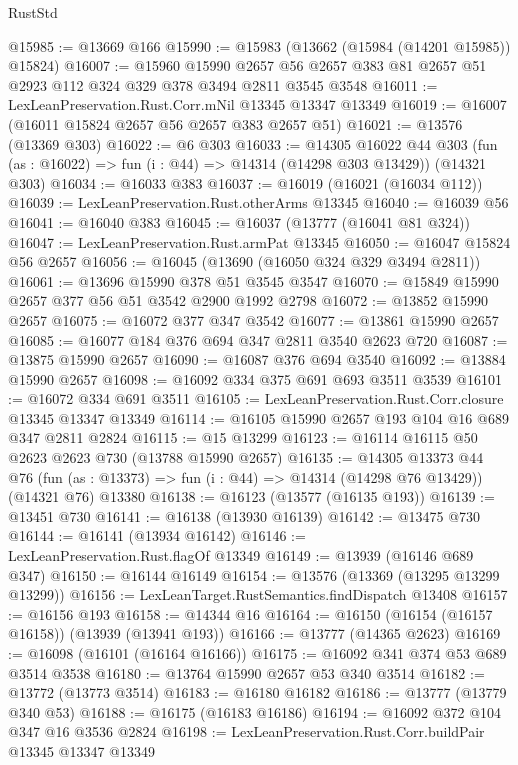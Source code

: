 \begin{lexlean}{RustStd}
\begin{coremodule}
@15985 := @13669 @166
@15990 := @15983 (@13662 (@15984 (@14201 @15985)) @15824)
@16007 := @15960
    @15990
    @2657
    @56
    @2657
    @383
    @81
    @2657
    @51
    @2923
    @112
    @324
    @329
    @378
    @3494
    @2811
    @3545
    @3548
@16011 := LexLeanPreservation.Rust.Corr.mNil @13345 @13347 @13349
@16019 := @16007 (@16011 @15824 @2657 @56 @2657 @383 @2657 @51)
@16021 := @13576 (@13369 @303)
@16022 := @6 @303
@16033 := @14305
    @16022
    @44
    @303
    (fun (as : @16022) => fun (i : @44) => @14314 (@14298 @303 @13429))
    (@14321 @303)
@16034 := @16033 @383
@16037 := @16019 (@16021 (@16034 @112))
@16039 := LexLeanPreservation.Rust.otherArms @13345
@16040 := @16039 @56
@16041 := @16040 @383
@16045 := @16037 (@13777 (@16041 @81 @324))
@16047 := LexLeanPreservation.Rust.armPat @13345
@16050 := @16047 @15824 @56 @2657
@16056 := @16045 (@13690 (@16050 @324 @329 @3494 @2811))
@16061 := @13696 @15990 @378 @51 @3545 @3547
@16070 := @15849 @15990 @2657 @377 @56 @51 @3542 @2900 @1992 @2798
@16072 := @13852 @15990 @2657
@16075 := @16072 @377 @347 @3542
@16077 := @13861 @15990 @2657
@16085 := @16077 @184 @376 @694 @347 @2811 @3540 @2623 @720
@16087 := @13875 @15990 @2657
@16090 := @16087 @376 @694 @3540
@16092 := @13884 @15990 @2657
@16098 := @16092 @334 @375 @691 @693 @3511 @3539
@16101 := @16072 @334 @691 @3511
@16105 := LexLeanPreservation.Rust.Corr.closure @13345 @13347 @13349
@16114 := @16105 @15990 @2657 @193 @104 @16 @689 @347 @2811 @2824
@16115 := @15 @13299
@16123 := @16114 @16115 @50 @2623 @2623 @730 (@13788 @15990 @2657)
@16135 := @14305
    @13373
    @44
    @76
    (fun (as : @13373) => fun (i : @44) => @14314 (@14298 @76 @13429))
    (@14321 @76)
    @13380
@16138 := @16123 (@13577 (@16135 @193))
@16139 := @13451 @730
@16141 := @16138 (@13930 @16139)
@16142 := @13475 @730
@16144 := @16141 (@13934 @16142)
@16146 := LexLeanPreservation.Rust.flagOf @13349
@16149 := @13939 (@16146 @689 @347)
@16150 := @16144 @16149
@16154 := @13576 (@13369 (@13295 @13299 @13299))
@16156 := LexLeanTarget.RustSemantics.findDispatch @13408
@16157 := @16156 @193
@16158 := @14344 @16
@16164 := @16150 (@16154 (@16157 @16158)) (@13939 (@13941 @193))
@16166 := @13777 (@14365 @2623)
@16169 := @16098 (@16101 (@16164 @16166))
@16175 := @16092 @341 @374 @53 @689 @3514 @3538
@16180 := @13764 @15990 @2657 @53 @340 @3514
@16182 := @13772 (@13773 @3514)
@16183 := @16180 @16182
@16186 := @13777 (@13779 @340 @53)
@16188 := @16175 (@16183 @16186)
@16194 := @16092 @372 @104 @347 @16 @3536 @2824
@16198 := LexLeanPreservation.Rust.Corr.buildPair @13345 @13347 @13349

\end{coremodule}
\end{lexlean}
